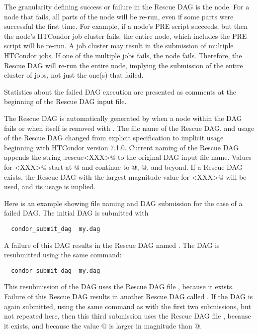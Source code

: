 The granularity defining success or failure
in the Rescue DAG is the node.
For a node that fails,
all parts of the node will be re-run,
even if some parts were successful the first time.
For example, if a node's PRE script
succeeds, but then the node's HTCondor job cluster fails,
the entire node, which includes the PRE script will be re-run.
A job cluster may result in the submission of multiple HTCondor jobs.
If one of the multiple jobs fails, the node fails.
Therefore, the Rescue DAG will
re-run the entire node,
implying the submission of the entire cluster of jobs,
not just the one(s) that failed.

Statistics about the failed DAG execution are presented as
comments at the beginning of the Rescue DAG input file.

The Rescue DAG is automatically generated by  when a node
within the DAG fails or when  itself is removed
with .
The file name of the Rescue DAG, and usage of the Rescue
DAG changed from explicit specification to implicit usage
beginning with HTCondor version 7.1.0.
Current naming of the Rescue DAG appends the string
\verb@.rescue<XXX>@ to the original DAG input file name.
Values for \verb@<XXX>@ start at @ and continue
to @, @, and beyond.
If a Rescue DAG exists,
the Rescue DAG with the largest magnitude value for \verb@<XXX>@
will be used, and its usage is implied.

Here is an example showing file naming and DAG submission
for the case of a failed DAG.
The initial DAG is submitted with
\begin{verbatim}
  condor_submit_dag  my.dag
\end{verbatim}
A failure of this DAG results in the Rescue DAG
named .
The DAG is resubmitted using the same command: 
\begin{verbatim}
  condor_submit_dag  my.dag
\end{verbatim}
This resubmission of the DAG uses the Rescue DAG file ,
because it exists.
Failure of this Rescue DAG results in another Rescue DAG
called .
If the DAG is again submitted, using the same command
as with the first two submissions, but not repeated here,
then this third submission uses the Rescue DAG file ,
because it exists, and because the value @ is larger
in magnitude than @.

